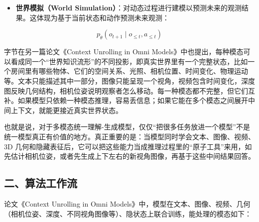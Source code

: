 \begin{itemize}
\tightlist
\item
  \textbf{世界模拟（World Simulation）}：对动态过程进行建模以预测未来的观测结果。这体现为基于当前状态和动作预测未来观测：
\end{itemize}

\[
p_{\theta}(o_{t+1}\mid o_{\le t},a_{\le t})
\]

字节在另一篇论文《Context Unrolling in Omni Models》中也提出，每种模态可以看成同一个``世界知识流形''的不同投影，即真实世界里有一个完整状态，比如一个房间里有哪些物体、它们的空间关系、光照、相机位置、时间变化、物理运动等。文本只能描述其中一部分，图像只能呈现一个视角，视频包含时间变化，深度图反映几何结构，相机位姿说明观察者怎么移动。每一种模态都不完整，但它们互补。如果模型只依赖一种模态推理，容易丢信息；如果它能在多个模态之间展开中间上下文，就能更接近真实世界状态。

也就是说，对于多模态统一理解-生成模型，仅仅``把很多任务放进一个模型''不是统一模型真正有价值的地方。真正重要的是：当模型同时学会文本、图像、视频、3D 几何和隐藏表征后，它可以把这些能力当成推理过程里的``原子工具''来用，如先估计相机位姿，或者先生成上下左右的新视角图像，再基于这些中间结果回答。

\hypertarget{ux4e8cux7b97ux6cd5ux5de5ux4f5cux6d41-1}{%
\subsection{二、算法工作流}\label{ux4e8cux7b97ux6cd5ux5de5ux4f5cux6d41-1}}

论文《Context Unrolling in Omni Models》中，模型在文本、图像、视频、几何（相机位姿、深度、不同视角图像等）、隐状态上联合训练，能处理的模态如下：


